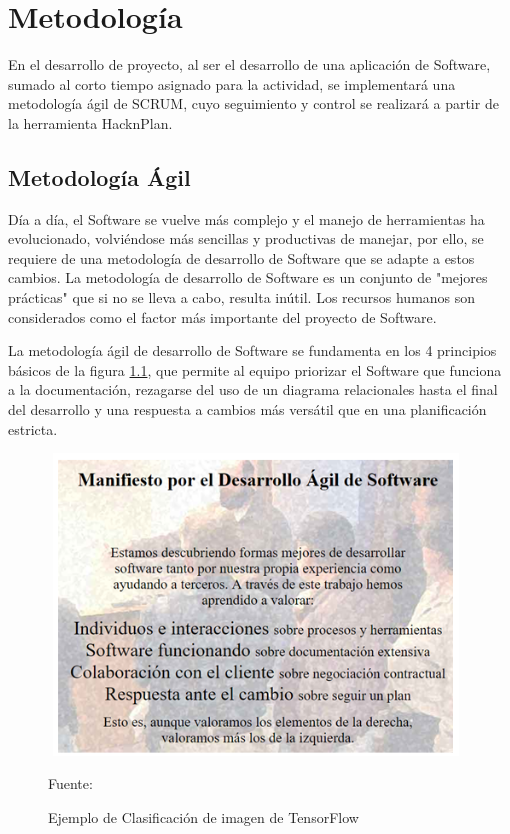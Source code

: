\chapter{Metodología}

En el desarrollo de proyecto, al ser el desarrollo de una aplicación de Software, sumado al corto tiempo asignado para la actividad, se implementará una metodología ágil de SCRUM, cuyo seguimiento y control se realizará a partir de la herramienta HacknPlan.

\section{Metodología Ágil}

Día a día, el Software se vuelve más complejo y el manejo de herramientas ha evolucionado, volviéndose más sencillas y productivas de manejar, por ello, se requiere de una metodología de desarrollo de Software que se adapte a estos cambios.
La metodología de desarrollo de Software es un conjunto de "mejores prácticas" que si no se lleva a cabo, resulta inútil\cite{carrizo2018metodo}. Los recursos humanos son considerados como el factor más importante del proyecto de Software.

La metodología ágil de desarrollo de Software se fundamenta en los 4 principios básicos de la figura \ref{manifiesto}, que permite al equipo priorizar el Software que funciona a la documentación, rezagarse del uso de un diagrama relacionales hasta el final del desarrollo y una respuesta a cambios más versátil que en una planificación estricta.
\\
\begin{figure}[t!]
	\centering
	\includegraphics[width=11cm,height=8cm,]{./Images/manifiesto.png}
	\caption{Ejemplo de Clasificación de imagen de TensorFlow}
	\footnotesize Fuente: \cite{beck2001manifiesto}
	\label{manifiesto}
\end{figure}

